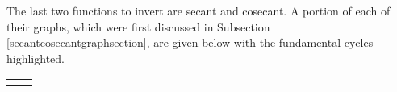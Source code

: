 \documentclass[12pt]{ximera}
\begin{document}
\smallskip

The last two functions to invert are secant and cosecant.  A portion of each of their graphs, which were first discussed in Subsection \ref{secantcosecantgraphsection}, are given below with the fundamental cycles highlighted. 

\bigskip

\begin{tabular}{cc}



& \hspace{.45in}


\end{tabular}
\end{document}
